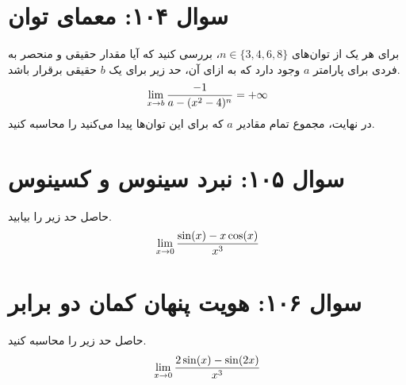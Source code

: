 \documentclass[12pt]{article}
\begin{document}
\vspace{1cm}
\hrulefill
\vspace{1cm}

\section*{سوال ۱۰۴: معمای توان}
برای هر یک از توان‌های \(n \in \{3, 4, 6, 8\}\)، بررسی کنید که آیا مقدار حقیقی و منحصر به فردی برای پارامتر \(a\) وجود دارد که به ازای آن، حد زیر برای یک \(b\) حقیقی برقرار باشد.
\begin{displaymath}
	\Large \lim_{x \to b} \frac{-1}{a - (x^2-4)^n} = +\infty
\end{displaymath}
در نهایت، مجموع تمام مقادیر \(a\) که برای این توان‌ها پیدا می‌کنید را محاسبه کنید.

\vspace{1cm}
\hrulefill
\vspace{1cm}

\section*{سوال ۱۰۵: نبرد سینوس و کسینوس}
حاصل حد زیر را بیابید.
\begin{displaymath}
	\Large \lim_{x \to 0} \frac{\sin(x) - x\cos(x)}{x^3}
\end{displaymath}

\vspace{1cm}
\hrulefill
\vspace{1cm}

\section*{سوال ۱۰۶: هویت پنهان کمان دو برابر}
حاصل حد زیر را محاسبه کنید.
\begin{displaymath}
	\Large \lim_{x \to 0} \frac{2\sin(x) - \sin(2x)}{x^3}
\end{displaymath}

\end{document}
